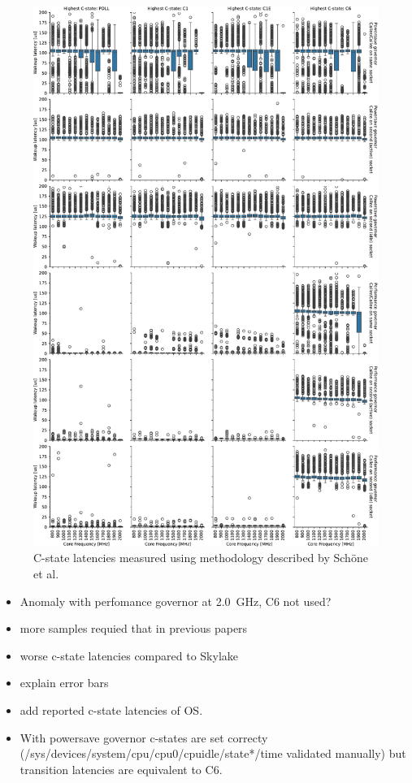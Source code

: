 \begin{figure}[]
    \centering
    \includegraphics[width=\columnwidth]{fig/C_state_latencies.pdf}
    \caption{\label{fig:c6_latencies}C-state latencies measured using methodology described by Schöne et al.}
\end{figure}

\begin{itemize}
    \item Anomaly with perfomance governor at \SI{2.0}{\GHz}, C6 not used?
    \item more samples requied that in previous papers
    \item worse c-state latencies compared to Skylake
    \item explain error bars
    \item add reported c-state latencies of OS.
    \item With powersave governor c-states are set correcty (/sys/devices/system/cpu/cpu0/cpuidle/state*/time validated manually) but transition latencies are equivalent to C6.
\end{itemize}
